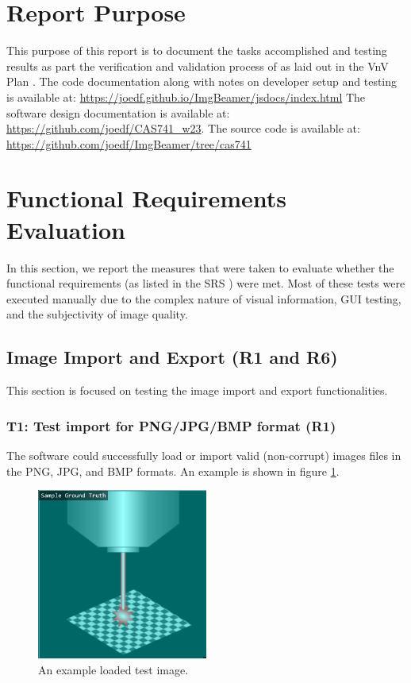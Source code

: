 \documentclass[12pt, titlepage]{article}
\begin{document}
\newpage


\section{Report Purpose}
This purpose of this report is to document the tasks accomplished and
testing results as part the verification and validation process of \progname{}
as laid out in the VnV Plan \cite{VnV_plan}. The code documentation along with notes
on developer setup and testing is available at:
\url{https://joedf.github.io/ImgBeamer/jsdocs/index.html} The software design documentation
is available at: \url{https://github.com/joedf/CAS741_w23}. The source code is
available at: \url{https://github.com/joedf/ImgBeamer/tree/cas741}

\section{Functional Requirements Evaluation}
In this section, we report the measures that were taken to evaluate whether the
functional requirements (as listed in the SRS \cite{SRS}) were met.
Most of these tests were executed manually due to the complex nature of visual information, GUI testing, and
the subjectivity of image quality.

\subsection{Image Import and Export (R1 and R6)}
This section is focused on testing the image import and export functionalities.

\subsubsection{T1: Test import for PNG/JPG/BMP format (R1)}
The software could successfully load or import valid (non-corrupt) images files in the PNG, JPG, and BMP formats.
An example is shown in figure \ref{fig_t1}.
\begin{figure}[h!]
  \begin{center}
   \includegraphics[width=0.5\textwidth]{t1.png}
  \caption{An example loaded test image.}
  \label{fig_t1}
  \end{center}
\end{figure}
\end{document}
